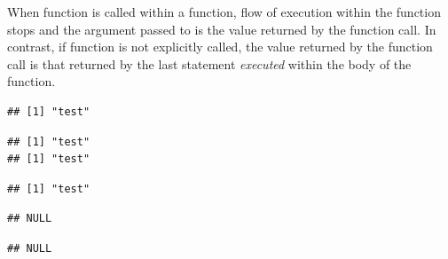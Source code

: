 \documentclass[krantz2]{krantz}\usepackage{knitr}%
\begin{document}
\begin{playground}
When function  is called within a function, flow of execution within the function stops and the argument passed
to  is the value returned by the function call. In contrast, if function  is not explicitly
called, the value returned by the function call is that returned by the last statement \emph{executed} within the body of the function.

\label{chunck:print:funs}
\begin{knitrout}\footnotesize
{}\color{fgcolor}\begin{kframe}
\begin{alltt}
 \hlkwb{<-} \hlstd{(}\hlstd{)\{}
\hlstd{(}\hlstd{)}
\end{alltt}
\begin{verbatim}
## [1] "test"
\end{verbatim}
\begin{alltt}
 \hlkwb{<-} \hlstd{(}\hlstd{)\{} 
\hlstd{(}\hlstd{)}
\end{alltt}
\begin{verbatim}
## [1] "test"
## [1] "test"
\end{verbatim}
\begin{alltt}
 \hlkwb{<-} \hlstd{(}\hlstd{)\{} 
\hlstd{(}\hlstd{)}
\end{alltt}
\begin{verbatim}
## [1] "test"
\end{verbatim}
\begin{alltt}
 \hlkwb{<-} \hlstd{(}\hlstd{)\{}\hlstd{();} 
\hlstd{(}\hlstd{)}
\end{alltt}
\begin{verbatim}
## NULL
\end{verbatim}
\begin{alltt}
 \hlkwb{<-} \hlstd{(}
\hlstd{(}\hlstd{)}
\end{alltt}
\begin{verbatim}
## NULL
\end{verbatim}
\end{kframe}
\end{knitrout}
\end{playground}
\end{document}
